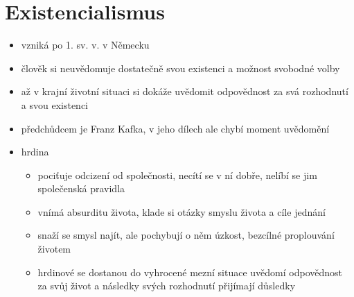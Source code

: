 \section{Existencialismus}
\begin{itemize}
\item vzniká po 1. sv. v. v Německu
\item člověk si neuvědomuje dostatečně svou existenci a možnost svobodné volby
\item až v krajní životní situaci si dokáže uvědomit odpovědnost za svá rozhodnutí a svou existenci
\item předchůdcem je Franz Kafka, v jeho dílech ale chybí moment uvědomění
\item hrdina 
	\begin{itemize}
	\item pociťuje odcizení od společnosti, necítí se v ní dobře, nelíbí se jim společenská pravidla
	\item vnímá absurditu života, klade si otázky smyslu života a cíle jednání
	\item snaží se smysl najít, ale pochybují o něm \ra úzkost, bezcílné proplouvání životem
	\item hrdinové se dostanou do vyhrocené mezní situace \ra uvědomí odpovědnost za svůj život a následky svých rozhodnutí \ra přijímají důsledky
	\end{itemize}
\end{itemize}


